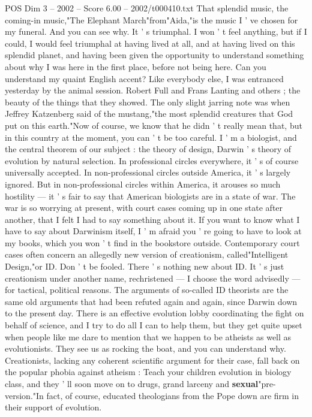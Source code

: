 \begin{textsample}{POS Dim 3 – 2002 – Score 6.00 – 2002/t000410.txt}  \label{ex:f3_pos_077}
That splendid music, the coming-in music,"The Elephant March"from"Aida,"is the music I ' ve chosen for my funeral.
And you can see why.
It ' s triumphal.
I won ' t feel anything, but if I could, I would feel triumphal at having lived at all, and at having lived on this splendid planet, and having been given the opportunity to understand something about why I was here in the first place, before not being here.
Can you understand my quaint English accent?
Like everybody else, I was entranced yesterday by the animal session.
Robert Full and Frans Lanting and others ; the beauty of the things that they showed.
The only slight jarring note was when Jeffrey Katzenberg said of the mustang,"the most splendid creatures that God put on this earth."Now of course, we know that he didn ' t really mean that, but in this country at the moment, you can ' t be too careful.
I ' m a biologist, and the central theorem of our subject : the theory of design, Darwin ' s theory of evolution by natural selection.
In professional circles everywhere, it ' s of course universally accepted.
In non-professional circles outside America, it ' s largely ignored.
But in non-professional circles within America, it arouses so much hostility — it ' s fair to say that American biologists are in a state of war.
The war is so worrying at present, with court cases coming up in one state after another, that I felt I had to say something about it.
If you want to know what I have to say about Darwinism itself, I ' m afraid you ' re going to have to look at my books, which you won ' t find in the bookstore outside.
Contemporary court cases often concern an allegedly new version of creationism, called"Intelligent Design,"or ID.
Don ' t be fooled.
There ' s nothing new about ID.
It ' s just creationism under another name, rechristened — I choose the word advisedly — for tactical, political reasons.
The arguments of so-called ID theorists are the same old arguments that had been refuted again and again, since Darwin down to the present day.
There is an effective evolution lobby coordinating the fight on behalf of science, and I try to do all I can to help them, but they get quite upset when people like me dare to mention that we happen to be atheists as well as evolutionists.
They see us as rocking the boat, and you can understand why.
Creationists, lacking any coherent scientific argument for their case, fall back on the popular phobia against atheism : Teach your children evolution in biology class, and they ' ll soon move on to drugs, grand larceny and \textbf{sexual}"pre-version."In fact, of course, educated theologians from the Pope down are firm in their support of evolution.

\end{textsample}
